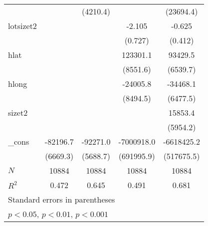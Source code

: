{\begin{tabular}{l*{4}{c}}
            &                     &    (4210.4)         &                     &   (23694.4)         \\
[1em]
lotsizet2   &                     &                     &      -2.105\sym{**} &      -0.625         \\
            &                     &                     &     (0.727)         &     (0.412)         \\
[1em]
hlat        &                     &                     &    123301.1\sym{***}&     93429.5\sym{***}\\
            &                     &                     &    (8551.6)         &    (6539.7)         \\
[1em]
hlong       &                     &                     &    -24005.8\sym{**} &    -34468.1\sym{***}\\
            &                     &                     &    (8494.5)         &    (6477.5)         \\
[1em]
sizet2      &                     &                     &                     &     15853.4\sym{**} \\
            &                     &                     &                     &    (5954.2)         \\
[1em]
\_cons      &    -82196.7\sym{***}&    -92271.0\sym{***}&  -7000918.0\sym{***}&  -6618425.2\sym{***}\\
            &    (6669.3)         &    (5688.7)         &  (691995.9)         &  (517675.5)         \\
\hline
\(N\)       &       10884         &       10884         &       10884         &       10884         \\
\(R^{2}\)   &       0.472         &       0.645         &       0.491         &       0.681         \\
\hline\hline
\multicolumn{5}{l}{\footnotesize Standard errors in parentheses}\\
\multicolumn{5}{l}{\footnotesize \sym{*} \(p<0.05\), \sym{**} \(p<0.01\), \sym{***} \(p<0.001\)}\\
\end{tabular}
}
